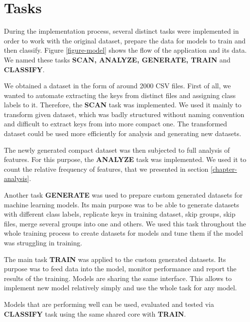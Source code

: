 \section{Tasks}

During the implementation process, several distinct tasks were implemented in order to work with the original dataset, prepare the data for models to train and then classify. Figure \ref{figure-model} shows the flow of the application and its data. We named these tasks \textbf{SCAN, ANALYZE, GENERATE, TRAIN} and \textbf{CLASSIFY}.

We obtained a dataset in the form of around 2000 CSV files. First of all, we wanted to automate extracting the keys from distinct files and assigning class labels to it. Therefore, the \textbf{SCAN} task was implemented. We used it mainly to transform given dataset, which was badly structured without naming convention and difficult to extract keys from into more compact one. The transformed dataset could be used more efficiently for analysis and generating new datasets.

The newly generated compact dataset was then subjected to full analysis of features. For this purpose, the \textbf{ANALYZE} task was implemented. We used it to count the relative frequency of features, that we presented in section \ref{chapter-analysis}.

Another task \textbf{GENERATE} was used to prepare custom generated datasets for machine learning models. Its main purpose was to be able to generate datasets with different class labels, replicate keys in training dataset, skip groups, skip files, merge several groups into one and others. We used this task throughout the whole training process to create datasets for models and tune them if the model was struggling in training.

The main task \textbf{TRAIN} was applied to the custom generated datasets. Its purpose was to feed data into the model, monitor performance and report the results of the training. Models are sharing the same interface. This allows to implement new model relatively simply and use the whole task for any model.

Models that are performing well can be used, evaluated and tested via \textbf{CLASSIFY} task using the same shared core with \textbf{TRAIN}.

